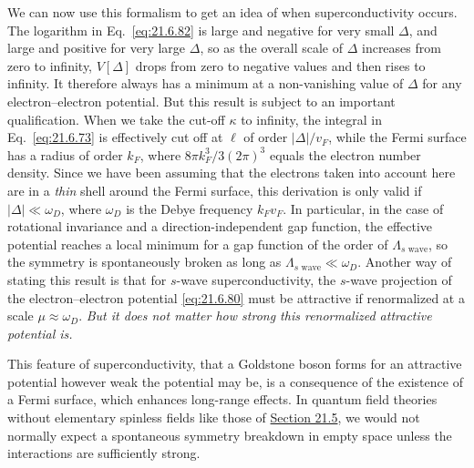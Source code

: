 We can now use this formalism to get an idea of when superconductivity occurs. The logarithm in Eq.~\eqref{eq:21.6.82} is large and negative for very small $\Delta$, and large and positive for very large $\Delta$, so as the overall scale of $\Delta$ increases from zero to infinity, $V[\Delta]$ drops from zero to negative values and then rises to infinity. It therefore always has a minimum at a non-vanishing value of $\Delta$ for any electron--electron potential. But this result is subject to an important qualification. When we take the cut-off $\kappa$ to infinity, the integral in Eq.~\eqref{eq:21.6.73} is effectively cut off at $\ell$ of order $|\Delta|/v_F$, while the Fermi surface has a radius of order $k_F$, where $8\pi k_F^3/3(2\pi)^3$ equals the electron number density. Since we have been assuming that the electrons taken into account here are in a \emph{thin} shell around the Fermi surface, this derivation is only valid if $|\Delta|\ll\omega_D$, where $\omega_D$ is the Debye frequency $k_Fv_F$. In particular, in the case of rotational invariance and a direction-independent gap function, the effective potential reaches a local minimum for a gap function of the order of $\Lambda_{s\text{ wave}}$, so the symmetry is spontaneously broken as long as $\Lambda_{s\text{ wave}}\ll\omega_D$. Another way of stating this result is that for $s$-wave superconductivity, the $s$-wave projection of the electron--electron potential \eqref{eq:21.6.80} must be attractive if renormalized at a scale $\mu\approx\omega_D$. \emph{But it does not matter how strong this renormalized attractive potential is.}

This feature of superconductivity, that a Goldstone boson forms for an attractive potential however weak the potential may be, is a consequence of the existence of a Fermi surface, which enhances long-range effects. In quantum field theories without elementary spinless fields like those of \hyperref[sec:21.5]{Section 21.5}, we would not normally expect a spontaneous symmetry breakdown in empty space unless the interactions are sufficiently strong.

